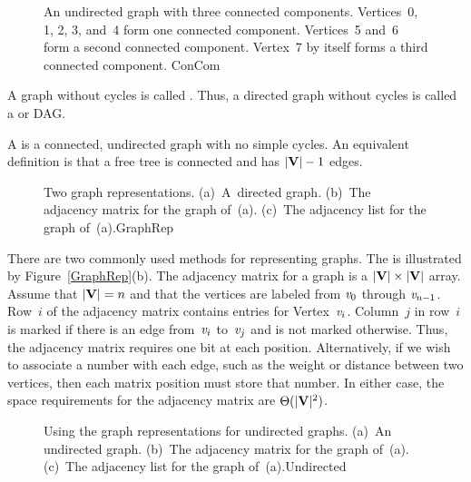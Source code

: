 \begin{figure}
\vspace{-\medskipamount}

{An undirected graph with three connected components.
Vertices~0, 1, 2, 3, and~4 form one connected component.
Vertices~5 and~6 form a second connected component.
Vertex~7 by itself forms a third connected component.}
{ConCom}
\bigskip
\end{figure}

A graph without cycles is called .
Thus, a directed graph without cycles is called a
 or
DAG.

A  is a connected, undirected graph with no simple
cycles.
An equivalent definition is that
a free tree is connected and has \(|{\textbf{V}}| - 1\) edges.

\begin{figure}
{Two graph representations.
(a)~A~directed graph.
(b)~The adjacency matrix for the graph of~(a).
(c)~The adjacency list for the graph of~(a).}{GraphRep}
\medskip
\end{figure}


There are two commonly used methods for representing graphs.
The 
is illustrated by Figure~\ref{GraphRep}(b).
The adjacency matrix for a graph is a
\mbox{\(|{\textbf{V}}| \times |{\textbf{V}}|\)} array.
Assume that \(|{\textbf{V}}| = n\) and that
the vertices are labeled from \({\textit{v}}_0\) through \({\textit{v}}_{n-1}\).
Row~\(i\) of the adjacency matrix contains entries for
Vertex~\({\textit{v}}_i\).
Column~\(j\) in row~\(i\) is marked if there is an edge
from~\({\textit{v}}_i\) to~\({\textit{v}}_j\) and is not marked otherwise.
Thus, the adjacency matrix requires one bit at each position.
Alternatively, if we wish to associate a number with each edge,
such as the weight or distance between two vertices,
then each matrix position must store that number.
In either case, the space requirements for the adjacency matrix are
\(\Theta(|{\textbf{V}}|^2)\).

\begin{figure}

\vspace{1pt}
{Using the graph representations for undirected graphs.
(a)~An undirected graph.
(b)~The adjacency matrix for the graph of~(a).
(c)~The adjacency list for the graph of~(a).}{Undirected}
\bigskip
\end{figure}

